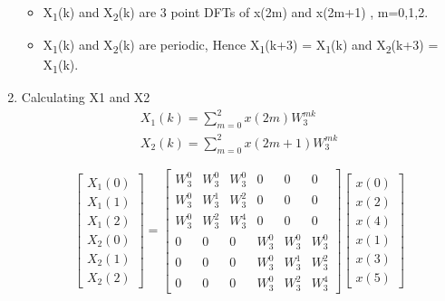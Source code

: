 \documentclass[journal,12pt,twocolumn]{IEEEtran}
\renewcommand\thesection{\arabic{section}}
\begin{document}
\begin{enumerate}[label=\thesection.\arabic*.,ref=\thesection.\theenumi]
\begin{itemize}
	\item X\textsubscript{1}(k) and X\textsubscript{2}(k) are 3 point DFTs of x(2m) and x(2m+1) , m=0,1,2.
	\item X\textsubscript{1}(k) and X\textsubscript{2}(k) are periodic, Hence X\textsubscript{1}(k+3) = X\textsubscript{1}(k) and X\textsubscript{2}(k+3) = X\textsubscript{1}(k).
\end{itemize}

\item Calculating X1 and X2
\begin{align}
X_{1}(k) = \sum_{m=0}^{2} x(2m)W^{mk}_{3} \\
X_{2}(k) = \sum_{m=0}^{2} x(2m+1)W^{mk}_{3}
\end{align}

\begin{equation}
\begin{bmatrix}
X_{1}(0) \\ 
X_{1}(1) \\ 
X_{1}(2) \\ 
X_{2}(0) \\ 
X_{2}(1) \\ 
X_{2}(2)
\end{bmatrix}
=
\begin{bmatrix}
W^{0}_{3} & W^{0}_{3} & W^{0}_{3} & 0 & 0 & 0\\
W^{0}_{3} & W^{1}_{3} & W^{2}_{3} & 0 & 0 & 0\\
W^{0}_{3} & W^{2}_{3} & W^{4}_{3} & 0 & 0 & 0\\
0 & 0 & 0 & W^{0}_{3} & W^{0}_{3} & W^{0}_{3}\\
0 & 0 & 0 & W^{0}_{3} & W^{1}_{3} & W^{2}_{3}\\
0 & 0 & 0 & W^{0}_{3} & W^{2}_{3} & W^{4}_{3}
\end{bmatrix}
\begin{bmatrix}
x(0) \\ 
x(2) \\ 
x(4) \\ 
x(1) \\ 
x(3) \\ 
x(5) 
\end{bmatrix}   
\end{equation}


\end{enumerate}
\end{document}
